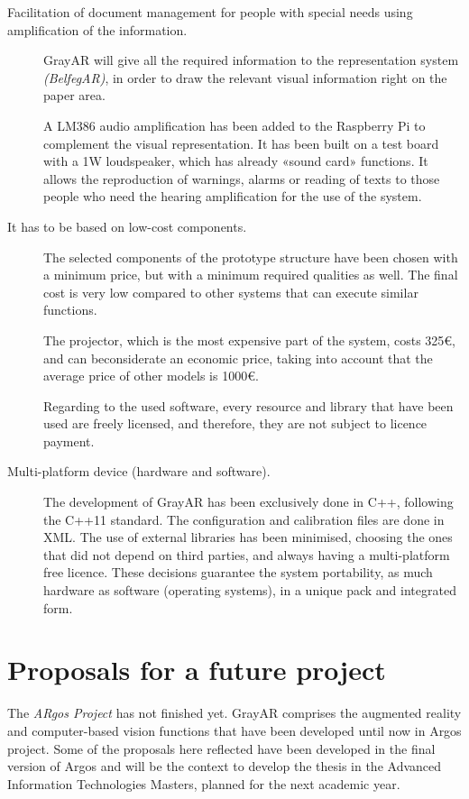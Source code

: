 \begin{description}
\item[Facilitation of document management for people with special needs using amplification of the information.] GrayAR will give all the required information to the representation system \textit{(BelfegAR)}, in order to draw the relevant visual information right on the paper area.

A LM386 audio amplification has been added to the Raspberry Pi to complement the visual representation. It has been built on a test board with a 1W loudspeaker, which has already «sound card» functions. It allows the reproduction of
warnings, alarms or reading of texts to those people who need the hearing amplification for the use of the system.

\item [It has to be based on low-cost components.] The selected components of the prototype structure have been chosen with a minimum price, but with a minimum required qualities as well. The final cost is very low compared to other systems that can execute similar functions.

The projector, which is the most expensive part of the system, costs 325\euro, and can beconsiderate an economic price, taking into account that the average price of other models is 1000\euro.

Regarding to the used software, every resource and library that have been used are freely licensed, and therefore, they are not subject to licence payment.

\item [Multi-platform device (hardware and software).] The development of GrayAR has been exclusively done in C++, following the C++11 standard. The configuration and calibration files are done in XML. The use of external libraries has been minimised, choosing the ones that did not depend on third parties, and always having a multi-platform free licence. These decisions guarantee the system portability, as much hardware as software (operating systems), in a unique pack and integrated form.
\end{description}

\section{Proposals for a future project}
The \textit{ARgos Project} has not finished yet. GrayAR comprises the augmented reality and computer-based vision functions that have been developed until now in Argos project. Some of the proposals here reflected have been developed in the final version of Argos and will be the context to develop the thesis in the Advanced Information Technologies Masters, planned for the next academic year. 

